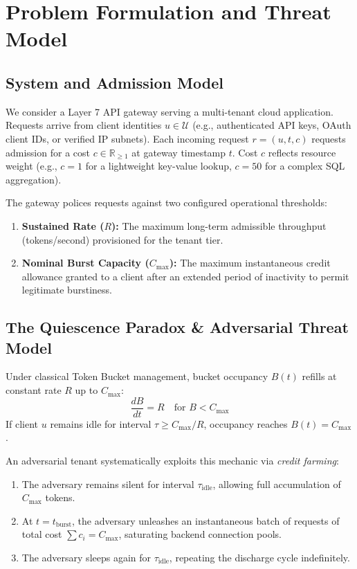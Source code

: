 \documentclass[conference]{IEEEtran}
\begin{document}
\section{Problem Formulation and Threat Model}

\subsection{System and Admission Model}
We consider a Layer 7 API gateway serving a multi-tenant cloud application. Requests arrive from client identities $u \in \mathcal{U}$ (e.g., authenticated API keys, OAuth client IDs, or verified IP subnets). Each incoming request $r = (u, t, c)$ requests admission for a cost $c \in \mathbb{R}_{\ge 1}$ at gateway timestamp $t$. Cost $c$ reflects resource weight (e.g., $c=1$ for a lightweight key-value lookup, $c=50$ for a complex SQL aggregation).

The gateway polices requests against two configured operational thresholds:
\begin{enumerate}
    \item \textbf{Sustained Rate ($R$):} The maximum long-term admissible throughput (tokens/second) provisioned for the tenant tier.
    \item \textbf{Nominal Burst Capacity ($C_{\max}$):} The maximum instantaneous credit allowance granted to a client after an extended period of inactivity to permit legitimate burstiness.
\end{enumerate}

\subsection{The Quiescence Paradox \& Adversarial Threat Model}
Under classical Token Bucket management, bucket occupancy $B(t)$ refills at constant rate $R$ up to $C_{\max}$:
\begin{equation}
\frac{dB}{dt} = R \quad \text{for } B < C_{\max}
\end{equation}
If client $u$ remains idle for interval $\tau \ge C_{\max}/R$, occupancy reaches $B(t) = C_{\max}$.

An adversarial tenant systematically exploits this mechanic via \textit{credit farming}:
\begin{enumerate}
    \item The adversary remains silent for interval $\tau_{\text{idle}}$, allowing full accumulation of $C_{\max}$ tokens.
    \item At $t = t_{\text{burst}}$, the adversary unleashes an instantaneous batch of requests of total cost $\sum c_i = C_{\max}$, saturating backend connection pools.
    \item The adversary sleeps again for $\tau_{\text{idle}}$, repeating the discharge cycle indefinitely.
\end{enumerate}
\end{document}

